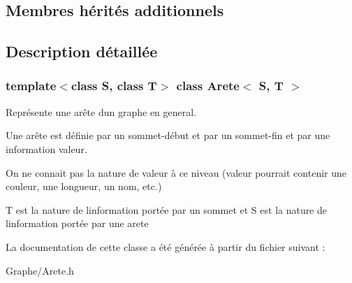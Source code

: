 \subsection*{Membres hérités additionnels}


\subsection{Description détaillée}
\subsubsection*{template$<$class S, class T$>$\newline
class Arete$<$ S, T $>$}

Représente une arête d\textquotesingle{}un graphe en general. 

Une arête est définie par un sommet-\/début et par un sommet-\/fin et par une information valeur.

On ne connait pas la nature de valeur à ce niveau (valeur pourrait contenir une couleur, une longueur, un nom, etc.)

T est la nature de l\textquotesingle{}information portée par un sommet et S est la nature de l\textquotesingle{}information portée par une arete 

La documentation de cette classe a été générée à partir du fichier suivant \+:\begin{DoxyCompactItemize}
\item 
Graphe/Arete.\+h\end{DoxyCompactItemize}
